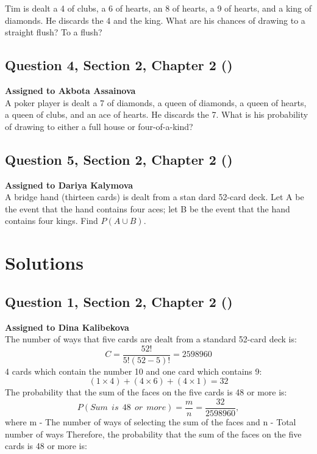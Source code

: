 \documentclass[12pt, a4paper]{article}
\begin{document}
\noindent Tim is dealt a 4 of clubs, a 6 of hearts, an 8 of hearts, a 9 of hearts, and a king of diamonds. He discards the 4 and the king. What are his chances of drawing to a straight flush? To a flush?


\subsection*{Question 4, Section 2, Chapter 2 (\cite{boyce11th})}

\noindent\textbf{Assigned to Akbota Assainova}\\

A poker player is dealt a 7 of diamonds, a queen of diamonds, a queen of hearts, a queen of clubs, and an ace of hearts. He discards the 7. What is his probability of drawing to either a full house or four-of-a-kind?


\subsection*{Question 5, Section 2, Chapter 2 (\cite{boyce11th})}

\noindent\textbf{Assigned to Dariya Kalymova}\\

\noindent A bridge hand (thirteen cards) is dealt from a stan dard 52-card deck. Let A be the event that the hand contains four aces; let B be the event that the hand contains four kings. Find
\begin{math}
 P(A \cup B).
 \end{math}\par 

\newpage

\section*{Solutions}

\subsection*{Question 1, Section 2, Chapter 2  (\cite{boyce11th})}

\noindent\textbf{Assigned to Dina Kalibekova}\\

\noindent The number of ways that five cards are dealt from a standard 52-card deck is:
$$
    C=\frac{52!}{5!(52-5)!}= 2598960
$$
4 cards which contain the number 10 and one card which contains 9:
$$
    (1\times4)+(4\times6)+(4\times1)=32
$$
The probability that the sum of the faces on the five cards is 48 or more is:
$$
   P(Sum \ \ is \ \ 48 \ \ or \ \ more) = \frac{m}{n} = \frac{32}{2598960},$$
\newline
where m - The number of ways of selecting the sum of the faces and n - Total number of ways
\newline
Therefore, the probability that the sum of the faces on the five cards is 48 or more is:
\end{document}
